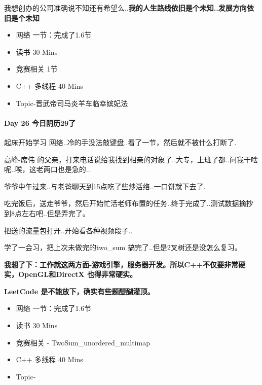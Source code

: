 \documentclass[UTF8,a4paper,8pt]{ctexart}
\begin{document}
	     我想创办的公司准确说不知还有希望么..\textbf{我的人生路线依旧是个未知..发展方向依旧是个未知}
	     \begin{itemize}
	     	\item  \makebox[0pt][l]{$\square$}\raisebox{.15ex}{\hspace{0.1em}$\checkmark$}网络  一节：完成了1.6节
	     	
	     	\item  \makebox[0pt][l]{$\square$}\raisebox{.15ex}{\hspace{0.1em}$\checkmark$}读书  30 Mins		 	
	     	\item  \makebox[0pt][l]{$\square$}\raisebox{.15ex}{\hspace{0.1em}$\checkmark$}竞赛相关 1节
	     	\item  \makebox[0pt][l]{$\square$}\raisebox{.15ex}{\hspace{0.1em}$\checkmark$}C++ 多线程  40 Mins
	     	
	     	\item \makebox[0pt][l]{$\square$}\raisebox{.15ex}{\hspace{0.1em}$\checkmark$}Topic-晋武帝司马炎羊车临幸嫔妃法
	     \end{itemize}
     \paragraph{Day 26   今日阴历29了   \quad     }
	     起床开始学习 网络..冷的手没法敲键盘..看了一节，然后就不被什么打断了.
	     
	     高峰-席伟 的父亲，打来电话说给我找到相亲的对象了..大专，上班了都..问我干啥呢..唉，这老两口也是急的..
	     
	     爷爷中午过来..与老爸聊天到15点吃了些炒活络..一口饼就下去了.
	     
	     吃完饭后，送走爷爷，然后开始忙活老师布置的任务..终于完成了..测试数据摘抄到8点左右吧..但是弄完了。
	     
	     把送的流量包打开..开始看各种视频段子..
	     
	     学了一会习，把上次未做完的two\_sum 搞完了..但是2叉树还是没怎么复习。
	     
	     \textbf{我想了下：工作就这两方面-游戏引擎，服务器开发。所以C++不仅要非常硬实，OpenGL和DirectX 也得非常硬实。}
	     
	     \textbf{LeetCode 是不能放下，确实有些题醍醐灌顶。}
	     \begin{itemize}
	     	\item  \makebox[0pt][l]{$\square$}\raisebox{.15ex}{\hspace{0.1em}$\checkmark$}网络  一节：完成了1.6节
	     	
	     	\item  读书  30 Mins		 	
	     	\item  \makebox[0pt][l]{$\square$}\raisebox{.15ex}{\hspace{0.1em}$\checkmark$}竞赛相关 - TwoSum\_unordered\_multimap
	     	\item  C++ 多线程  40 Mins
	     	
	     	\item Topic-
	     \end{itemize}
\end{document}
